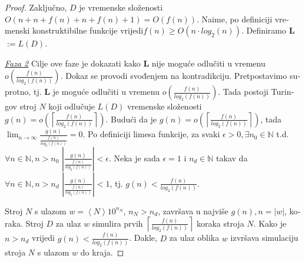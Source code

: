 \documentclass[12pt]{rectors}
\begin{document}
\begin{otherlanguage}{croatian}
\begin{proof}
Zaključno, $D$ je vremenske složenosti $O \left (n+n+f(n)+n+f(n)+1 \right ) = O \left (f(n) \right )$. Naime, po definiciji vremenski konstruktibilne funkcije vrijedi\newline $f(n) \geq O \left (n \cdot log_2 \left ( n \right ) \right ) $.
Definiramo \textbf{L}$:= L(D)$.

\vspace{1cm}
\underline{\textit{Faza 2}}\newline
Cilje ove faze je dokazati kako \textbf{L} nije moguće odlučiti u 
vremenu $o\left (\frac {f\left ( n \right )}{log_2\left ( f\left ( n \right ) \right )} \right )$.\newline
Dokaz se provodi svođenjem na kontradikciju. Pretpostavimo suprotno, tj.
 \textbf{L} je moguće odlučiti u 
 vremenu $o\left (\frac {f\left ( n \right )}{log_2\left ( f\left ( n \right ) \right )} \right )$.
\newline
Tada postoji Turingov stroj $N$ koji odlučuje $L(D)$ vremenske složenosti $g(n) = o \left( \left \lceil{ \frac{f(n)}{log_2(f(n))} }\right \rceil \right )$.
Budući da je \newline $g(n) = o \left( \left \lceil{ \frac{f(n)}{log_2(f(n))} }\right \rceil \right )$, tada $ \lim_{n \to \infty} \frac{g(n)}{\frac {f\left ( n \right )}{log_2\left ( f\left ( n \right ) \right )}}  = 0$. \newline
Po definiciji limesa funkcije, 
za svaki $\epsilon > 0, \exists n_0 \in \mathbb{N}$  \newline t.d. $\forall n \in \mathbb{N}, n > n_0$ 
$\left |\frac{g(n)}{\frac {f\left ( n \right )}{log_2\left ( f\left ( n \right ) \right )}} \right | < \epsilon$.\newline
Neka je sada $\epsilon = 1$ i $n_{d} \in \mathbb{N}$ takav da  $\forall n \in \mathbb{N}, n > n_d$ 
$\left |\frac{g(n)}{\frac {f\left ( n \right )}{log_2\left ( f\left ( n \right ) \right )}} \right | < 1$,
tj. $g(n) < \frac {f\left ( n \right )}{log_2\left ( f\left ( n \right ) \right )}$. 

Stroj $N$ s ulazom $w = \left < N \right >10^{n_N}$, $n_N > n_d$, završava u najviše $g(n), n = \left | w \right |$, koraka. Stroj $D$ 
za ulaz $w$
simulira prvih $\left \lceil \frac {f\left ( n \right )}{log_2\left ( f\left ( n \right ) \right )}\right \rceil$ koraka stroja $N$. Kako je 
$n > n_d$ vrijedi $g(n) < \frac {f\left ( n \right )}{log_2\left ( f\left ( n \right ) \right )}$. Dakle, $D$ za
ulaz oblika $w$ izvršava simulaciju stroja $N$ s ulazom $w$ do kraja. 
\newline


\end{proof}
\end{otherlanguage}
\end{document}
